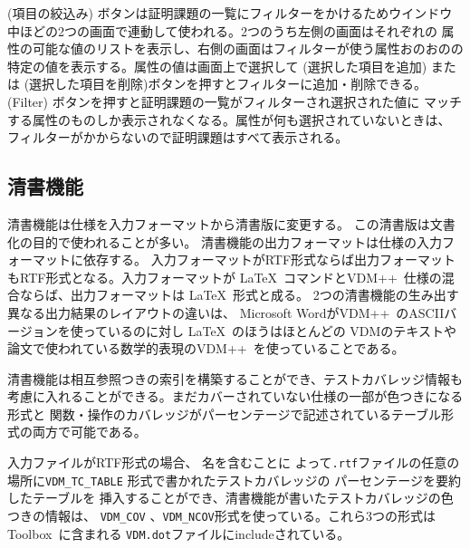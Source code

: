 \documentclass[\pformat,12pt]{jarticle}
\newcommand{\vdmslpp}{VDM++}
\newcommand{\Toolbox}{Toolbox}
\newcommand{\guicmd}[1]{{\gt #1}}
\begin{document}
(\guicmd{項目の絞込み}) ボタンは証明課題の一覧にフィルターをかけるためウインドウ
中ほどの2つの画面で連動して使われる。2つのうち左側の画面はそれぞれの
属性の可能な値のリストを表示し、右側の画面はフィルターが使う属性おのおのの
特定の値を表示する。属性の値は画面上で選択して%
(\guicmd{選択した項目を追加}) または%
(\guicmd{選択した項目を削除})ボタンを押すとフィルターに追加・削除できる。 %
(\guicmd{Filter}) ボタンを押すと証明課題の一覧がフィルターされ選択された値に%
マッチする属性のものしか表示されなくなる。属性が何も選択されていないときは、%
フィルターがかからないので証明課題はすべて表示される。

\newpage
\subsection{清書機能}\label{sec:pp}


清書機能は仕様を入力フォーマットから清書版に変更する。
この清書版は文書化の目的で使われることが多い。
清書機能の出力フォーマットは仕様の入力フォーマットに依存する。
入力フォーマットがRTF形式ならば出力フォーマットもRTF形式となる。入力フォーマットが
 \LaTeX\ コマンドと\vdmslpp\ 仕様の混合ならば、出力フォーマットは \LaTeX\ 形式と成る。
2つの清書機能の生み出す異なる出力結果のレイアウトの違いは、
Microsoft Wordが\vdmslpp\ のASCIIバージョンを使っているのに対し \LaTeX\ のほうはほとんどの
VDMのテキストや論文で使われている数学的表現の\vdmslpp\ を使っていることである。

清書機能は相互参照つきの索引を構築することができ、テストカバレッジ情報も
考慮に入れることができる。まだカバーされていない仕様の一部が色つきになる形式と
関数・操作のカバレッジがパーセンテージで記述されているテーブル形式の両方で可能である。

入力ファイルがRTF形式の場合、 名を含むことに
よって{\tt .rtf}ファイルの任意の場所に\texttt{VDM\_TC\_TABLE} 形式で書かれたテストカバレッジの
パーセンテージを要約したテーブルを
挿入することができ、清書機能が書いたテストカバレッジの色つきの情報は、
 \texttt{VDM\_COV}  、\texttt{VDM\_NCOV}形式を使っている。これら3つの形式は\Toolbox\ に含まれる
{\tt VDM.dot}ファイルにincludeされている。
\end{document}
